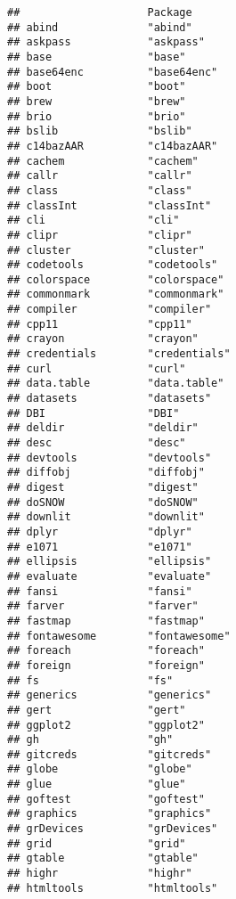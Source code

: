 \documentclass[
]{article}
\begin{document}
\begin{verbatim}
##                    Package             
## abind              "abind"             
## askpass            "askpass"           
## base               "base"              
## base64enc          "base64enc"         
## boot               "boot"              
## brew               "brew"              
## brio               "brio"              
## bslib              "bslib"             
## c14bazAAR          "c14bazAAR"         
## cachem             "cachem"            
## callr              "callr"             
## class              "class"             
## classInt           "classInt"          
## cli                "cli"               
## clipr              "clipr"             
## cluster            "cluster"           
## codetools          "codetools"         
## colorspace         "colorspace"        
## commonmark         "commonmark"        
## compiler           "compiler"          
## cpp11              "cpp11"             
## crayon             "crayon"            
## credentials        "credentials"       
## curl               "curl"              
## data.table         "data.table"        
## datasets           "datasets"          
## DBI                "DBI"               
## deldir             "deldir"            
## desc               "desc"              
## devtools           "devtools"          
## diffobj            "diffobj"           
## digest             "digest"            
## doSNOW             "doSNOW"            
## downlit            "downlit"           
## dplyr              "dplyr"             
## e1071              "e1071"             
## ellipsis           "ellipsis"          
## evaluate           "evaluate"          
## fansi              "fansi"             
## farver             "farver"            
## fastmap            "fastmap"           
## fontawesome        "fontawesome"       
## foreach            "foreach"           
## foreign            "foreign"           
## fs                 "fs"                
## generics           "generics"          
## gert               "gert"              
## ggplot2            "ggplot2"           
## gh                 "gh"                
## gitcreds           "gitcreds"          
## globe              "globe"             
## glue               "glue"              
## goftest            "goftest"           
## graphics           "graphics"          
## grDevices          "grDevices"         
## grid               "grid"              
## gtable             "gtable"            
## highr              "highr"             
## htmltools          "htmltools"         

\end{verbatim}
\end{document}
